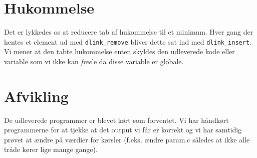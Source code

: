 \documentclass[titlepage]{article}
\begin{document}
\section{Hukommelse}
Det er lykkedes os at reducere tab af hukommelse til et minimum. Hver gang der hentes et element ud
med {\tt dlink\_remove} bliver dette sat ind med {\tt dlink\_insert}. Vi mener at den tabte
hukommelse enten skyldes den udleverede kode eller variable som vi ikke kan {\it free}'e da disse
variable er globale.

\section{Afvikling}
De udleverede programmer er blevet kørt som forventet. Vi har håndkørt programmerne for at tjekke at
det output vi får er korrekt og vi har samtidig prøvet at ændre på værdier for kørsler (f.eks. ændre
param.c således at ikke alle tråde kører lige mange gange).
\end{document}

